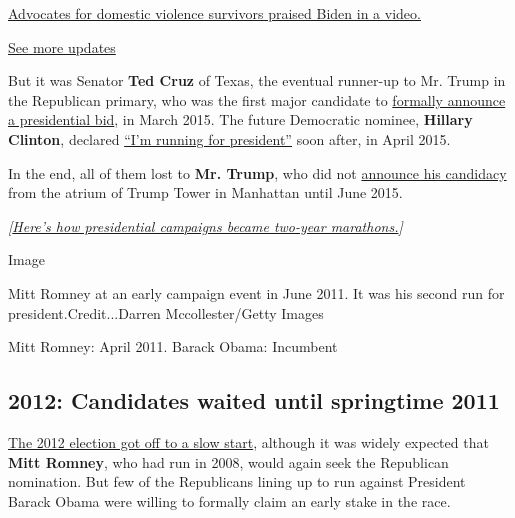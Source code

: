 \href{https://www.nytimes3xbfgragh.onion/live/2020/08/19/us/dnc-convention-election?action=click\&pgtype=Article\&state=default\&region=MAIN_CONTENT_1\&context=storylines_live_updates\#advocates-for-domestic-violence-survivors-praised-biden-in-a-video}{Advocates
for domestic violence survivors praised Biden in a video.}

\href{https://www.nytimes3xbfgragh.onion/live/2020/08/19/us/dnc-convention-election?action=click\&pgtype=Article\&state=default\&region=MAIN_CONTENT_1\&context=storylines_live_updates}{See
more updates}

But it was Senator \textbf{Ted Cruz} of Texas, the eventual runner-up to
Mr. Trump in the Republican primary, who was the first major candidate
to
\href{https://www.nytimes3xbfgragh.onion/2015/03/24/us/politics/ted-cruz-2016-presidential-race.html}{formally
announce a presidential bid}, in March 2015. The future Democratic
nominee, \textbf{Hillary Clinton}, declared
\href{https://www.nytimes3xbfgragh.onion/2015/04/13/us/politics/hillary-clinton-2016-presidential-campaign.html}{``I'm
running for president''} soon after, in April 2015.

In the end, all of them lost to \textbf{Mr. Trump}, who did not
\href{https://www.nytimes3xbfgragh.onion/2015/06/17/us/politics/donald-trump-runs-for-president-this-time-for-real-he-says.html}{announce
his candidacy} from the atrium of Trump Tower in Manhattan until June
2015.

\emph{{[}}\href{https://www.nytimes3xbfgragh.onion/2015/04/17/upshot/how-presidential-campaigns-became-two-year-marathons.html}{\emph{Here's
how presidential campaigns became two-year marathons.}}\emph{{]}}

Image

Mitt Romney at an early campaign event in June 2011. It was his second
run for president.Credit...Darren Mccollester/Getty Images

Mitt Romney: April 2011. Barack Obama: Incumbent

\hypertarget{2012-candidates-waited-until-springtime-2011}{%
\subsection{2012: Candidates waited until springtime
2011}\label{2012-candidates-waited-until-springtime-2011}}

\href{https://thecaucus.blogs.nytimes3xbfgragh.onion/2011/02/25/lots-of-talk-but-still-no-2012-republican-candidates/}{The
2012 election got off to a slow start}, although it was widely expected
that \textbf{Mitt Romney}, who had run in 2008, would again seek the
Republican nomination. But few of the Republicans lining up to run
against President Barack Obama were willing to formally claim an early
stake in the race.

